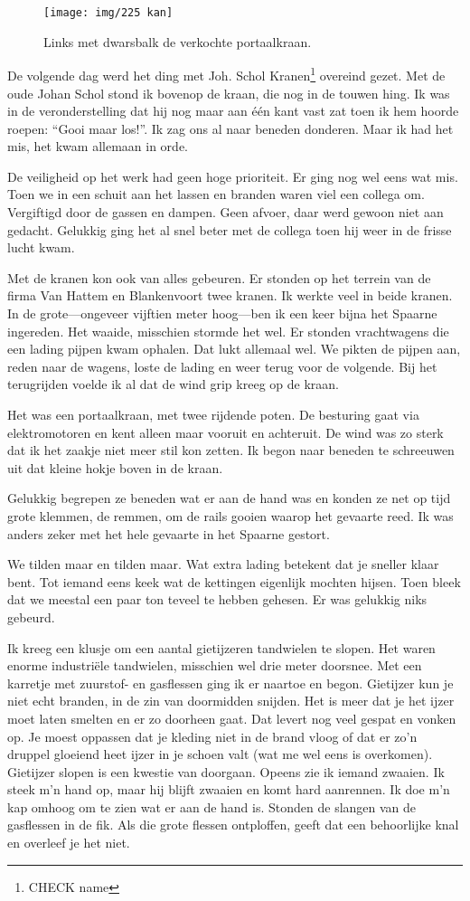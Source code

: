 \documentclass[10pt,twoside, openright]{memoir}
\begin{document}
\begin{figure}
\texttt{[image: img/225 kan]}
\caption*{\footnotesize Links met dwarsbalk de verkochte portaalkraan.}
\end{figure}

De volgende dag werd het ding met Joh. Schol Kranen\footnote{CHECK name} overeind gezet. Met de oude Johan Schol stond ik bovenop de kraan, die nog in de touwen hing. Ik was in de veronderstelling dat hij nog maar aan één kant vast zat toen ik hem hoorde roepen: ``Gooi maar los!''. Ik zag ons al naar beneden donderen. Maar ik had het mis, het kwam allemaan in orde. 

De veiligheid op het werk had geen hoge prioriteit. Er ging nog wel eens wat mis. Toen we in een schuit aan het lassen en branden waren viel een collega om. Vergiftigd door de gassen en dampen. Geen afvoer, daar werd gewoon niet aan gedacht. Gelukkig ging het al snel beter met de collega toen hij weer in de frisse lucht kwam.

Met de kranen kon ook van alles gebeuren. Er stonden op het terrein van de firma Van Hattem en Blankenvoort twee kranen. Ik werkte veel in beide kranen. In de grote---ongeveer vijftien meter hoog---ben ik een keer bijna het Spaarne ingereden. Het waaide, misschien stormde het wel. Er stonden vrachtwagens die een lading pijpen kwam ophalen. Dat lukt allemaal wel. We pikten de pijpen aan, reden naar de wagens, loste de lading en weer terug voor de volgende. Bij het terugrijden voelde ik al dat de wind grip kreeg op de kraan. 

Het was een portaalkraan, met twee rijdende poten. De besturing gaat via elektromotoren en kent alleen maar vooruit en achteruit. De wind was zo sterk dat ik het zaakje niet meer stil kon zetten. Ik begon naar beneden te schreeuwen uit dat kleine hokje boven in de kraan. 

Gelukkig begrepen ze beneden wat er aan de hand was en konden ze net op tijd grote klemmen, de remmen, om de rails gooien waarop het gevaarte reed. Ik was anders zeker met het hele gevaarte in het Spaarne gestort.

We tilden maar en tilden maar. Wat extra lading betekent dat je sneller klaar bent. Tot iemand eens keek wat de kettingen eigenlijk mochten hijsen. Toen bleek dat we meestal een paar ton teveel te hebben gehesen. Er was gelukkig niks gebeurd.

Ik kreeg een klusje om een aantal gietijzeren tandwielen te slopen. Het waren enorme industriële tandwielen, misschien wel drie meter doorsnee. Met een karretje met zuurstof- en gasflessen ging ik er naartoe en begon. Gietijzer kun je niet echt branden, in de zin van doormidden snijden. Het is meer dat je het ijzer moet laten smelten en er zo doorheen gaat. Dat levert nog veel gespat en vonken op. Je moest oppassen dat je kleding niet in de brand vloog of dat er zo’n druppel gloeiend heet ijzer in je schoen valt (wat me wel eens is overkomen). Gietijzer slopen is een kwestie van doorgaan. Opeens zie ik iemand zwaaien. Ik steek m’n hand op, maar hij blijft zwaaien en komt hard aanrennen. Ik doe m’n kap omhoog om te zien wat er aan de hand is. Stonden de slangen van de gasflessen in de fik. Als die grote flessen ontploffen, geeft dat een behoorlijke knal en overleef je het niet. 
\end{document}
